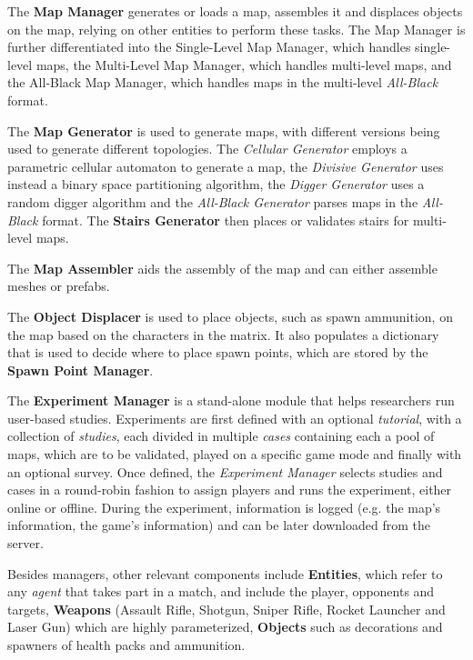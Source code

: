 The \textbf{Map Manager} generates or loads a map, assembles it and displaces objects on the map, relying on other entities to perform these tasks. The Map Manager is further differentiated into the Single-Level Map Manager, which handles single-level maps, the Multi-Level Map Manager, which handles multi-level maps, and the All-Black Map Manager, which handles maps in the multi-level \textit{All-Black} format.

The \textbf{Map Generator} is used to generate maps, with different versions being used to generate different topologies. The \textit{Cellular Generator} employs a parametric cellular automaton to generate a map, the \textit{Divisive Generator} uses instead a binary space partitioning algorithm, the \textit{Digger Generator} uses a random digger algorithm and the \textit{All-Black Generator} parses maps in the \textit{All-Black} format. The \textbf{Stairs Generator} then places or validates stairs for multi-level maps.

The \textbf{Map Assembler} aids the assembly of the map and can either assemble meshes or prefabs.

The \textbf{Object Displacer} is used to place objects, such as spawn ammunition, on the map based on the characters in the matrix. It also populates a dictionary that is used to decide where to place spawn points, which are stored by the \textbf{Spawn Point Manager}.

The \textbf{Experiment Manager} is a stand-alone module that helps researchers run user-based studies. Experiments are first defined with an optional \textit{tutorial}, with a collection of \textit{studies}, each divided in multiple \textit{cases} containing each a pool of maps, which are to be validated, played on a specific game mode and finally with an optional survey. Once defined, the \textit{Experiment Manager} selects studies and cases in a round-robin fashion to assign players and runs the experiment, either online or offline. During the experiment, information is logged (e.g. the map's information, the game's information) and can be later downloaded from the server.

Besides managers, other relevant components include \textbf{Entities}, which refer to any \textit{agent} that takes part in a match, and include the player, opponents and targets, \textbf{Weapons} (Assault Rifle, Shotgun, Sniper Rifle, Rocket Launcher and Laser Gun) which are highly parameterized, \textbf{Objects} such as decorations and spawners of health packs and ammunition. 

